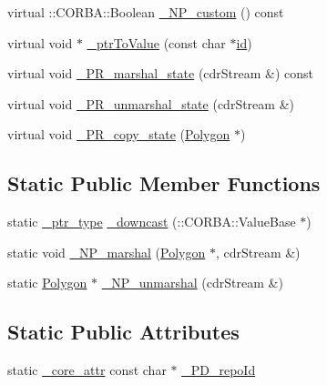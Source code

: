 \begin{DoxyCompactItemize}
virtual \+::C\+O\+R\+B\+A\+::\+Boolean \hyperlink{class_polygon_ab6de4781af8430d79d65cbc17a07cede}{\+\_\+\+N\+P\+\_\+custom} () const 
\item 
virtual void $\ast$ \hyperlink{class_polygon_a3a92b1e0e80c8fdc33e0f2788321f314}{\+\_\+ptr\+To\+Value} (const char $\ast$\hyperlink{class_draw_a1bf27c5a59da9002d55936c947dce2cc}{id})
\item 
virtual void \hyperlink{class_polygon_a914894e25e18b467be8f5c3050b0bcbe}{\+\_\+\+P\+R\+\_\+marshal\+\_\+state} (cdr\+Stream \&) const 
\item 
virtual void \hyperlink{class_polygon_a991333f1f730256d07552568fa175780}{\+\_\+\+P\+R\+\_\+unmarshal\+\_\+state} (cdr\+Stream \&)
\item 
virtual void \hyperlink{class_polygon_a884210bc08f053ae5951e719fccbfe14}{\+\_\+\+P\+R\+\_\+copy\+\_\+state} (\hyperlink{class_polygon}{Polygon} $\ast$)
\end{DoxyCompactItemize}
\subsection*{Static Public Member Functions}
\begin{DoxyCompactItemize}
\item 
static \hyperlink{class_draw_a5164256572b3c4123ceecd1897c248dd}{\+\_\+ptr\+\_\+type} \hyperlink{class_polygon_ac866909cd0f37369c8b9a9367faeb72d}{\+\_\+downcast} (\+::C\+O\+R\+B\+A\+::\+Value\+Base $\ast$)
\item 
static void \hyperlink{class_polygon_a8ccbe5c3f82a1095d4c7a772ff5b8918}{\+\_\+\+N\+P\+\_\+marshal} (\hyperlink{class_polygon}{Polygon} $\ast$, cdr\+Stream \&)
\item 
static \hyperlink{class_polygon}{Polygon} $\ast$ \hyperlink{class_polygon_a1a84fd2c1473ceb918f5cfa2bebdbcc5}{\+\_\+\+N\+P\+\_\+unmarshal} (cdr\+Stream \&)
\end{DoxyCompactItemize}
\subsection*{Static Public Attributes}
\begin{DoxyCompactItemize}
\item 
static \hyperlink{_petit_prince_8hpp_a5f7bf7cddb608c2aad7c95f55f8a33c5}{\+\_\+core\+\_\+attr} const char $\ast$ \hyperlink{class_polygon_a3a8f0f25cfccaaf86f64f226442a6a08}{\+\_\+\+P\+D\+\_\+repo\+Id}
\end{DoxyCompactItemize}
